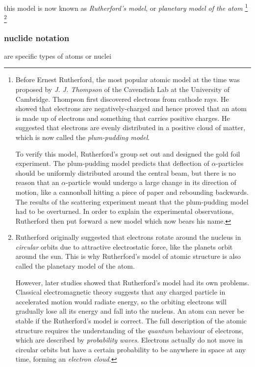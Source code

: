 this model is now known as \emph{Rutherford's model}, or \emph{planetary model of the atom}
\footnote{
	Before Ernest Rutherford, the most popular atomic model at the time was proposed by \emph{J. J. Thompson} of the Cavendish Lab at the University of Cambridge. Thompson first discovered electrons from cathode rays. He showed that electrons are negatively-charged and hence proved that an atom is made up of electrons and something that carries positive charges. He suggested that electrons are evenly distributed in a positive cloud of matter, which is now called the \emph{plum-pudding model}.
	
	To verify this model, Rutherford's group set out and designed the gold foil experiment. The plum-pudding model predicts that deflection of $\alpha$-particles should be uniformly distributed around the central beam, but there is no reason that an $\alpha$-particle would undergo a large change in its direction of motion, like a cannonball hitting a piece of paper and rebounding backwards. The results of the scattering experiment meant that the plum-pudding model had to be overturned. In order to explain the experimental observations, Rutherford then put forward a new model which now bears his name.}
\footnote{
	 Rutherford originally suggested that electrons rotate around the nucleus in \emph{circular} orbits due to attractive electrostatic force, like the planets orbit around the sun. This is why Rutherford's model of atomic structure is also called the planetary model of the atom.
	 
	 However, later studies showed that Rutherford's model had its own problems. Classical electromagnetic theory suggests that any charged particle in accelerated motion would radiate energy, so the orbiting electrons will gradually lose all its energy and fall into the nucleus. An atom can never be stable if the Rutherford's model is correct. The full description of the atomic structure requires the understanding of the \emph{quantum} behaviour of electrons, which are described by \emph{probability waves}. Electrons actually do not move in circular orbits but have a certain probability to be anywhere in space at any time, forming an \emph{electron cloud}.
 }




\subsubsection{nuclide notation}

 are specific types of atoms or nuclei

